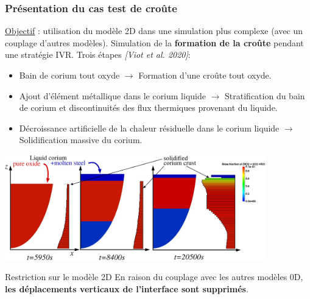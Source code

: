 \documentclass{beamer}
\newcommand{\bib}[1]{{\color{cea_texte!80}\tiny\textit{[#1]}}}
\begin{document}
\begin{frame}
    \frametitle{Présentation du cas test de croûte}
 \scriptsize
    \underline{Objectif} : utilisation du modèle 2D dans une simulation plus complexe (avec un couplage d'autres modèles). Simulation de la \textbf{formation de la croûte} pendant une stratégie IVR. Trois étapes \bib{Viot et al. 2020}:
    \begin{itemize}
        \item Bain de corium tout oxyde $\rightarrow$ Formation d'une croûte tout oxyde.
        \item Ajout d'élément métallique dans le corium liquide $\rightarrow$ Stratification du bain de corium et discontinuités des flux thermiques provenant du liquide.
        \item Décroissance artificielle de la chaleur résiduelle dans le corium liquide  $\rightarrow$ Solidification massive du corium.
    \end{itemize}
    \begin{center}
    \includegraphics[width=0.85\textwidth]{Figures/industrial_test_sketch.pdf}
    \end{center}
    
        	\begin{ceaalertblock}{Restriction sur le modèle 2D}
        	\tiny
        	En raison du couplage avec les autres modèles 0D, \textbf{les déplacements verticaux de l'interface sont supprimés}.
    	\end{ceaalertblock}
    
\end{frame}
\end{document}
